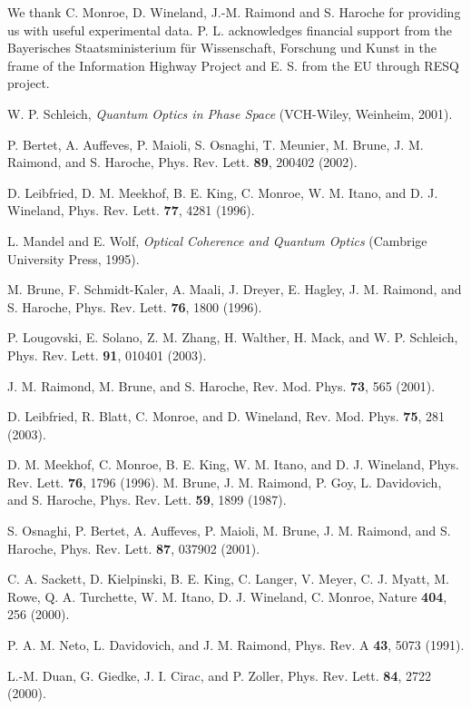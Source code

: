 \documentclass[pra,aps,twocolumn,showpacs]{revtex4}
\begin{document}
We thank C. Monroe, D. Wineland, J.-M. Raimond and S. Haroche for
providing us with useful experimental data. P. L. acknowledges
financial support from the Bayerisches Staatsministerium f\"ur
Wissenschaft, Forschung und Kunst in the frame of the Information
Highway Project and E. S. from the EU through RESQ project.


\begin{thebibliography}{99}

 W. P. Schleich, {\it Quantum
Optics in Phase Space} (VCH-Wiley, Weinheim, 2001).

 P. Bertet, A. Auffeves, P. Maioli, S. Osnaghi,
T. Meunier, M. Brune, J. M. Raimond, and S. Haroche, Phys. Rev.
Lett. {\bf 89}, 200402 (2002).

 D. Leibfried, D. M. Meekhof, B. E. King, C. Monroe,
W. M. Itano, and D. J. Wineland, Phys. Rev. Lett. {\bf 77}, 4281
(1996).

 L. Mandel and E. Wolf, {\it
Optical Coherence and Quantum Optics} (Cambrige University Press,
1995).

 M. Brune, F. Schmidt-Kaler, A. Maali, J. Dreyer, E. Hagley,
J. M. Raimond, and S. Haroche, Phys. Rev. Lett. {\bf 76}, 1800
(1996).

 P. Lougovski, E. Solano, Z. M. Zhang, H. Walther,
H. Mack, and W. P. Schleich, Phys. Rev. Lett. {\bf 91}, 010401
(2003).

 J. M. Raimond, M. Brune, and S. Haroche,
Rev. Mod. Phys. {\bf 73}, 565 (2001).

 D. Leibfried, R. Blatt, C. Monroe, and D.
Wineland, Rev. Mod. Phys. {\bf 75}, 281 (2003).

 D. M. Meekhof, C. Monroe, B. E. King, W. M. Itano,
and D. J. Wineland, Phys. Rev. Lett. {\bf 76}, 1796 (1996).
 M. Brune, J. M. Raimond, P. Goy, L. Davidovich, and
S. Haroche, Phys. Rev. Lett. {\bf 59}, 1899 (1987).

 S. Osnaghi, P. Bertet, A. Auffeves, P. Maioli,
M. Brune, J. M. Raimond, and S. Haroche, Phys. Rev. Lett. {\bf
87}, 037902 (2001).

 C. A. Sackett, D. Kielpinski, B. E. King,
C. Langer, V. Meyer, C. J. Myatt, M. Rowe, Q. A. Turchette, W. M.
Itano, D. J. Wineland, C. Monroe, Nature {\bf 404}, 256 (2000).

 P. A. M. Neto, L. Davidovich, and J. M. Raimond,
Phys. Rev. A {\bf 43}, 5073 (1991).

 L.-M. Duan, G. Giedke, J. I. Cirac, and P. Zoller,
Phys. Rev. Lett. {\bfseries 84}, 2722 (2000).


\end{thebibliography}
\end{document}
